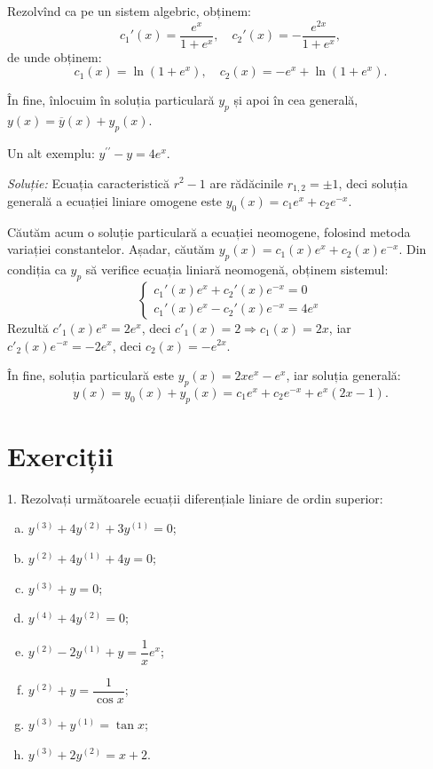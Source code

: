 Rezolvînd ca pe un sistem algebric, obținem:
\[
  c_1'(x) = \frac{e^x}{1 + e^x}, \quad c_2'(x) = -\frac{e^{2x}}{1 + e^x},
\]
de unde obținem:
\[
  c_1(x) = \ln(1 + e^x), \quad c_2(x) = -e^x + \ln(1 + e^x).
\]

În fine, înlocuim în soluția particulară $y_p$ și apoi în cea generală,
$y(x) = \overline{y}(x) + y_p(x)$.

\vspace{1cm}

Un alt exemplu: $y^{\prime\prime} - y = 4e^x$.

\emph{Soluție:} Ecuația caracteristică $r^2 - 1$ are rădăcinile $r_{1,2} = \pm 1$,
deci soluția generală a ecuației liniare omogene este $y_0(x) = c_1 e^x + c_2e^{-x}$.

Căutăm acum o soluție particulară a ecuației neomogene, folosind metoda variației
constantelor. Așadar, căutăm $y_p(x) = c_1(x) e^x + c_2(x) e^{-x}$. Din condiția
ca $y_p$ să verifice ecuația liniară neomogenă, obținem sistemul:
\[
  \begin{cases}
    c_1'(x) e^x + c_2'(x) e^{-x} = 0 \\
    c_1'(x) e^x - c_2'(x) e^{-x} = 4e^x
  \end{cases}
\]
Rezultă $c'_1(x)e^x = 2e^x$, deci $c'_1(x) = 2 \Rightarrow c_1(x) = 2x$, iar
$c'_2(x) e^{-x} = -2e^x$, deci $c_2(x) = -e^{2x}$.

În fine, soluția particulară este $y_p(x) = 2xe^x - e^x$, iar soluția generală:
\[
  y(x) = y_0(x) + y_p(x) = c_1e^x + c_2 e^{-x} + e^x(2x - 1).
\]


\section{Exerciții}

1. Rezolvați următoarele ecuații diferențiale liniare de ordin superior:
\begin{enumerate}[(a)]
\item $ y^{(3)} + 4y^{(2)} + 3y^{(1)} = 0 $;
\item $ y^{(2)} + 4y^{(1)} + 4y = 0 $;
\item $ y^{(3)} + y = 0 $;
\item $ y^{(4)} + 4y^{(2)} = 0 $;
\item $ y^{(2)} - 2y^{(1)} + y = \dfrac{1}{x} e^x $;
\item $ y^{(2)} + y = \dfrac{1}{\cos x} $;
\item $ y^{(3)} + y^{(1)} = \tan x $;
\item $ y^{(3)} + 2y^{(2)} = x + 2 $.
\end{enumerate}

